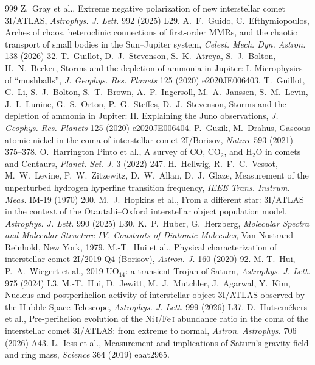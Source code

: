 \documentclass[11pt]{article}
\theoremstyle{definition}\newtheorem{definition}[theorem]{Definition}
\theoremstyle{remark}\newtheorem{remark}[theorem]{Remark}
\begin{document}
\begin{thebibliography}{999}
 Z.~Gray et al., Extreme negative polarization of new interstellar comet 3I/ATLAS, \emph{Astrophys. J. Lett.} 992 (2025) L29.
 A.~F.~Guido, C.~Efthymiopoulos, Arches of chaos, heteroclinic connections of first-order MMRs, and the chaotic transport of small bodies in the Sun--Jupiter system, \emph{Celest. Mech. Dyn. Astron.} 138 (2026) 32.
 T.~Guillot, D.~J.~Stevenson, S.~K.~Atreya, S.~J.~Bolton, H.~N.~Becker, Storms and the depletion of ammonia in Jupiter: I. Microphysics of ``mushballs'', \emph{J. Geophys. Res. Planets} 125 (2020) e2020JE006403.
 T.~Guillot, C.~Li, S.~J.~Bolton, S.~T.~Brown, A.~P.~Ingersoll, M.~A.~Janssen, S.~M.~Levin, J.~I.~Lunine, G.~S.~Orton, P.~G.~Steffes, D.~J.~Stevenson, Storms and the depletion of ammonia in Jupiter: II. Explaining the Juno observations, \emph{J. Geophys. Res. Planets} 125 (2020) e2020JE006404.
 P.~Guzik, M.~Drahus, Gaseous atomic nickel in the coma of interstellar comet 2I/Borisov, \emph{Nature} 593 (2021) 375--378.
 O.~Harrington Pinto et al., A survey of CO, CO$_2$, and H$_2$O in comets and Centaurs, \emph{Planet. Sci. J.} 3 (2022) 247.
 H.~Hellwig, R.~F.~C.~Vessot, M.~W.~Levine, P.~W.~Zitzewitz, D.~W.~Allan, D.~J.~Glaze, Measurement of the unperturbed hydrogen hyperfine transition frequency, \emph{IEEE Trans. Instrum. Meas.} IM-19 (1970) 200.
 M.~J.~Hopkins et al., From a different star: 3I/ATLAS in the context of the \=Otautahi--Oxford interstellar object population model, \emph{Astrophys. J. Lett.} 990 (2025) L30.
 K.~P.~Huber, G.~Herzberg, \emph{Molecular Spectra and Molecular Structure IV. Constants of Diatomic Molecules}, Van Nostrand Reinhold, New York, 1979.
 M.-T.~Hui et al., Physical characterization of interstellar comet 2I/2019 Q4 (Borisov), \emph{Astron. J.} 160 (2020) 92.
 M.-T.~Hui, P.~A.~Wiegert et al., 2019 UO$_{14}$: a transient Trojan of Saturn, \emph{Astrophys. J. Lett.} 975 (2024) L3.
 M.-T.~Hui, D.~Jewitt, M.~J.~Mutchler, J.~Agarwal, Y.~Kim, Nucleus and postperihelion activity of interstellar object 3I/ATLAS observed by the Hubble Space Telescope, \emph{Astrophys. J. Lett.} 999 (2026) L37.
 D.~Hutsem\'ekers et al., Pre-perihelion evolution of the Ni\,\textsc{i}/Fe\,\textsc{i} abundance ratio in the coma of the interstellar comet 3I/ATLAS: from extreme to normal, \emph{Astron. Astrophys.} 706 (2026) A43.
 L.~Iess et al., Measurement and implications of Saturn's gravity field and ring mass, \emph{Science} 364 (2019) eaat2965.

\end{thebibliography}
\end{document}
